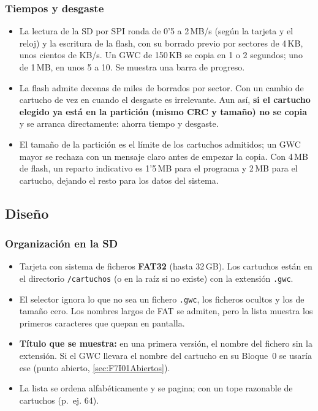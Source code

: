 \subsubsection{Tiempos y desgaste}

\begin{itemize}
	\item La lectura de la SD por SPI ronda de 0'5 a 2\,MB/s (según la tarjeta y el reloj) y la escritura de la flash, con su borrado previo por sectores de 4\,KB, unos cientos de KB/s. Un GWC de 150\,KB se copia en 1 o 2 segundos; uno de 1\,MB, en unos 5 a 10. Se muestra una barra de progreso.
	\item La flash admite decenas de miles de borrados por sector. Con un cambio de cartucho de vez en cuando el desgaste es irrelevante. Aun así, \textbf{si el cartucho elegido ya está en la partición (mismo CRC y tamaño) no se copia} y se arranca directamente: ahorra tiempo y desgaste.
	\item El tamaño de la partición es el límite de los cartuchos admitidos; un GWC mayor se rechaza con un mensaje claro antes de empezar la copia. Con 4\,MB de flash, un reparto indicativo es 1'5\,MB para el programa y 2\,MB para el cartucho, dejando el resto para los datos del sistema.
\end{itemize}

\subsection{Diseño}
\label{sec:F7I01Diseno}

\subsubsection{Organización en la SD}

\begin{itemize}
	\item Tarjeta con sistema de ficheros \textbf{FAT32} (hasta 32\,GB). Los cartuchos están en el directorio \texttt{/cartuchos} (o en la raíz si no existe) con la extensión \texttt{.gwc}.
	\item El selector ignora lo que no sea un fichero \texttt{.gwc}, los ficheros ocultos y los de tamaño cero. Los nombres largos de FAT se admiten, pero la lista muestra los primeros caracteres que quepan en pantalla.
	\item \textbf{Título que se muestra:} en una primera versión, el nombre del fichero sin la extensión. Si el GWC llevara el nombre del cartucho en su Bloque~0 se usaría ese (punto abierto, \ref{sec:F7I01Abiertos}).
	\item La lista se ordena alfabéticamente y se pagina; con un tope razonable de cartuchos (p.~ej. 64).
\end{itemize}

